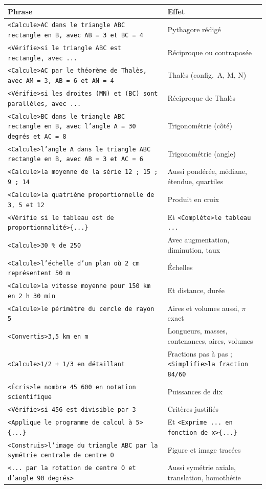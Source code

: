 \documentclass[11pt,a4paper]{article}
\newcommand{\bal}[1]{\texttt{#1}}
\begin{document}
\begin{longtable}{@{}ll@{}}
\toprule
\textbf{Phrase} & \textbf{Effet} \\
\midrule
\bal{<Calcule>AC dans le triangle ABC rectangle en B, avec AB = 3 et BC = 4} & Pythagore rédigé \\
\bal{<Vérifie>si le triangle ABC est rectangle, avec ...} & Réciproque ou contraposée \\
\bal{<Calcule>AC par le théorème de Thalès, avec AM = 3, AB = 6 et AN = 4} & Thalès (config.\ A, M, N) \\
\bal{<Vérifie>si les droites (MN) et (BC) sont parallèles, avec ...} & Réciproque de Thalès \\
\bal{<Calcule>BC dans le triangle ABC rectangle en B, avec l'angle A = 30 degrés et AC = 8} & Trigonométrie (côté) \\
\bal{<Calcule>l'angle A dans le triangle ABC rectangle en B, avec AB = 3 et AC = 6} & Trigonométrie (angle) \\
\bal{<Calcule>la moyenne de la série 12 ; 15 ; 9 ; 14} & Aussi pondérée, médiane, étendue, quartiles \\
\bal{<Calcule>la quatrième proportionnelle de 3, 5 et 12} & Produit en croix \\
\bal{<Vérifie si le tableau est de proportionnalité>\{...\}} & Et \bal{<Complète>le tableau ...} \\
\bal{<Calcule>30 \% de 250} & Avec augmentation, diminution, taux \\
\bal{<Calcule>l'échelle d'un plan où 2 cm représentent 50 m} & Échelles \\
\bal{<Calcule>la vitesse moyenne pour 150 km en 2 h 30 min} & Et distance, durée \\
\bal{<Calcule>le périmètre du cercle de rayon 5} & Aires et volumes aussi, $\pi$ exact \\
\bal{<Convertis>3,5 km en m} & Longueurs, masses, contenances, aires, volumes \\
\bal{<Calcule>1/2 + 1/3 en détaillant} & Fractions pas à pas ; \bal{<Simplifie>la fraction 84/60} \\
\bal{<Écris>le nombre 45 600 en notation scientifique} & Puissances de dix \\
\bal{<Vérifie>si 456 est divisible par 3} & Critères justifiés \\
\bal{<Applique le programme de calcul à 5>\{...\}} & Et \bal{<Exprime ... en fonction de x>\{...\}} \\
\bal{<Construis>l'image du triangle ABC par la symétrie centrale de centre O} & Figure et image tracées \\
\bal{<... par la rotation de centre O et d'angle 90 degrés>} & Aussi symétrie axiale, translation, homothétie \\
\bottomrule
\end{longtable}
\end{document}
